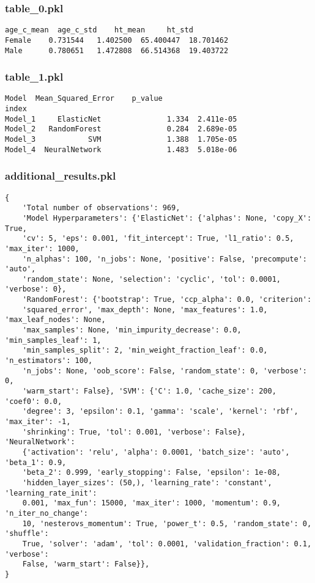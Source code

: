 \documentclass[11pt]{article}
\begin{document}
\subsubsection*{table\_0.pkl}

\begin{Verbatim}[tabsize=4]
        age_c_mean  age_c_std    ht_mean     ht_std
Female    0.731544   1.402500  65.400447  18.701462
Male      0.780651   1.472808  66.514368  19.403722
\end{Verbatim}

\subsubsection*{table\_1.pkl}

\begin{Verbatim}[tabsize=4]
                 Model  Mean_Squared_Error    p_value
index
Model_1     ElasticNet               1.334  2.411e-05
Model_2   RandomForest               0.284  2.689e-05
Model_3            SVM               1.388  1.705e-05
Model_4  NeuralNetwork               1.483  5.018e-06
\end{Verbatim}

\subsubsection*{additional\_results.pkl}

\begin{Verbatim}[tabsize=4]
{
    'Total number of observations': 969,
    'Model Hyperparameters': {'ElasticNet': {'alphas': None, 'copy_X': True,
	'cv': 5, 'eps': 0.001, 'fit_intercept': True, 'l1_ratio': 0.5, 'max_iter': 1000,
	'n_alphas': 100, 'n_jobs': None, 'positive': False, 'precompute': 'auto',
	'random_state': None, 'selection': 'cyclic', 'tol': 0.0001, 'verbose': 0},
	'RandomForest': {'bootstrap': True, 'ccp_alpha': 0.0, 'criterion':
	'squared_error', 'max_depth': None, 'max_features': 1.0, 'max_leaf_nodes': None,
	'max_samples': None, 'min_impurity_decrease': 0.0, 'min_samples_leaf': 1,
	'min_samples_split': 2, 'min_weight_fraction_leaf': 0.0, 'n_estimators': 100,
	'n_jobs': None, 'oob_score': False, 'random_state': 0, 'verbose': 0,
	'warm_start': False}, 'SVM': {'C': 1.0, 'cache_size': 200, 'coef0': 0.0,
	'degree': 3, 'epsilon': 0.1, 'gamma': 'scale', 'kernel': 'rbf', 'max_iter': -1,
	'shrinking': True, 'tol': 0.001, 'verbose': False}, 'NeuralNetwork':
	{'activation': 'relu', 'alpha': 0.0001, 'batch_size': 'auto', 'beta_1': 0.9,
	'beta_2': 0.999, 'early_stopping': False, 'epsilon': 1e-08,
	'hidden_layer_sizes': (50,), 'learning_rate': 'constant', 'learning_rate_init':
	0.001, 'max_fun': 15000, 'max_iter': 1000, 'momentum': 0.9, 'n_iter_no_change':
	10, 'nesterovs_momentum': True, 'power_t': 0.5, 'random_state': 0, 'shuffle':
	True, 'solver': 'adam', 'tol': 0.0001, 'validation_fraction': 0.1, 'verbose':
	False, 'warm_start': False}},
}
\end{Verbatim}
\end{document}
